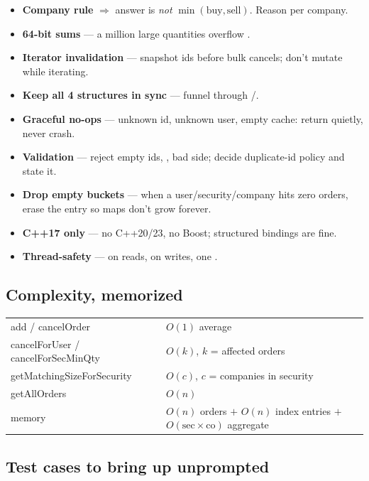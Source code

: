 \begin{itemize}[leftmargin=1.6em,label=\textcolor{Sell}{\faBug}]
  \item \textbf{Company rule} $\Rightarrow$ answer is \emph{not} $\min(\text{buy},\text{sell})$. Reason per company.
  \item \textbf{64-bit sums} --- a million large quantities overflow .
  \item \textbf{Iterator invalidation} --- snapshot ids before bulk cancels; don't mutate while iterating.
  \item \textbf{Keep all 4 structures in sync} --- funnel through /.
  \item \textbf{Graceful no-ops} --- unknown id, unknown user, empty cache: return quietly, never crash.
  \item \textbf{Validation} --- reject empty ids, , bad side; decide duplicate-id policy and state it.
  \item \textbf{Drop empty buckets} --- when a user/security/company hits zero orders, erase the entry so maps don't grow forever.
  \item \textbf{C++17 only} --- no C++20/23, no Boost; structured bindings are fine.
  \item \textbf{Thread-safety} ---  on reads,  on writes, one .
\end{itemize}

\subsection{Complexity, memorized}

\begin{center}
\renewcommand{\arraystretch}{1.25}
\begin{tabular}{@{}ll@{}}
\toprule
add / cancelOrder & $O(1)$ average \\
cancelForUser / cancelForSecMinQty & $O(k)$, $k$ = affected orders \\
getMatchingSizeForSecurity & $O(c)$, $c$ = companies in security \\
getAllOrders & $O(n)$ \\
memory & $O(n)$ orders $+$ $O(n)$ index entries $+$ $O(\text{sec}\times\text{co})$ aggregate \\
\bottomrule
\end{tabular}
\end{center}

\subsection{Test cases to bring up unprompted}

